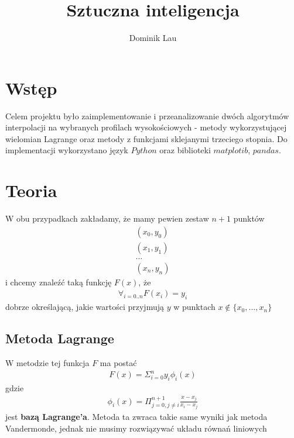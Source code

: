 \documentclass{article}
\title{Sztuczna inteligencja}
\author{Dominik Lau}
\begin{document}
\maketitle
\section{Wstęp}
Celem projektu było zaimplementowanie i przeanalizowanie dwóch
algorytmów interpolacji na wybranych profilach wysokościowych - metody wykorzystującej wielomian Lagrange oraz metody z funkcjami sklejanymi trzeciego stopnia.
Do implementacji wykorzystano język $Python$ oraz biblioteki
$matplotib$, $pandas$.
\section{Teoria}
W obu przypadkach zakładamy, że mamy pewien zestaw $n+1$ punktów
\begin{gather*}
	(x_0, y_0) \\
	(x_1, y_1) \\
	...\\
	(x_n, y_n)
\end{gather*}
i chcemy znaleźć taką funkcję $F(x)$, że
\begin{gather*}
	\forall_{i= 0..n}  F(x_i) = y_i
\end{gather*}
dobrze określającą, jakie wartości przyjmują $y$ w punktach $x \notin \{x_0, ..., x_n\}$
\subsection{Metoda Lagrange}
W metodzie tej funkcja $F$ ma postać
\begin{gather*}
	F(x) = \Sigma_{i=0}^{n} y_i \phi_i(x)
\end{gather*}
gdzie 
\begin{gather*}
	\phi_i(x) = \Pi_{j=0,  j \ne i}^{n+1} \frac{x-x_j}{x_i - x_j}
\end{gather*}
jest \textbf{bazą Lagrange'a}. Metoda ta zwraca takie same wyniki
jak metoda Vandermonde, jednak nie musimy rozwiązywać układu równań liniowych
\end{document}

